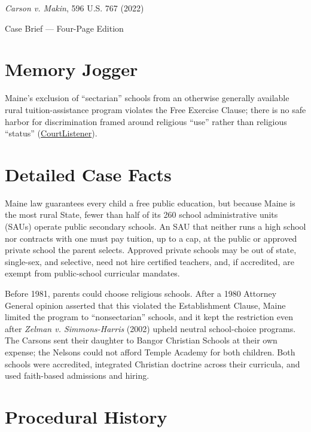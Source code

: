 \documentclass[12pt]{article}
\begin{document}
\begin{center}
{\LARGE \textit{Carson v. Makin}, 596 U.S. 767 (2022)\par}
\vspace{0.8em}
{\large Case Brief --- Four-Page Edition\par}
\end{center}
\vspace{1em}

\section{Memory Jogger}

Maine's exclusion of ``sectarian'' schools from an otherwise generally available rural tuition-assistance program violates the Free Exercise Clause; there is no safe harbor for discrimination framed around religious ``use'' rather than religious ``status'' (\href{https://www.courtlistener.com/opinion/6479298/carson-v-makin/}{CourtListener}).

\section{Detailed Case Facts}

Maine law guarantees every child a free public education, but because Maine is the most rural State, fewer than half of its 260 school administrative units (SAUs) operate public secondary schools. An SAU that neither runs a high school nor contracts with one must pay tuition, up to a cap, at the public or approved private school the parent selects. Approved private schools may be out of state, single-sex, and selective, need not hire certified teachers, and, if accredited, are exempt from public-school curricular mandates.

Before 1981, parents could choose religious schools. After a 1980 Attorney General opinion asserted that this violated the Establishment Clause, Maine limited the program to ``nonsectarian'' schools, and it kept the restriction even after \textit{Zelman v. Simmons-Harris} (2002) upheld neutral school-choice programs. The Carsons sent their daughter to Bangor Christian Schools at their own expense; the Nelsons could not afford Temple Academy for both children. Both schools were accredited, integrated Christian doctrine across their curricula, and used faith-based admissions and hiring.

\section{Procedural History}
\end{document}
